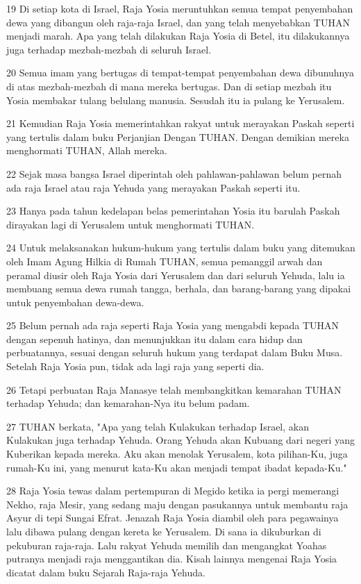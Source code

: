 \par 19 Di setiap kota di Israel, Raja Yosia meruntuhkan semua tempat penyembahan dewa yang dibangun oleh raja-raja Israel, dan yang telah menyebabkan TUHAN menjadi marah. Apa yang telah dilakukan Raja Yosia di Betel, itu dilakukannya juga terhadap mezbah-mezbah di seluruh Israel.
\par 20 Semua imam yang bertugas di tempat-tempat penyembahan dewa dibunuhnya di atas mezbah-mezbah di mana mereka bertugas. Dan di setiap mezbah itu Yosia membakar tulang belulang manusia. Sesudah itu ia pulang ke Yerusalem.
\par 21 Kemudian Raja Yosia memerintahkan rakyat untuk merayakan Paskah seperti yang tertulis dalam buku Perjanjian Dengan TUHAN. Dengan demikian mereka menghormati TUHAN, Allah mereka.
\par 22 Sejak masa bangsa Israel diperintah oleh pahlawan-pahlawan belum pernah ada raja Israel atau raja Yehuda yang merayakan Paskah seperti itu.
\par 23 Hanya pada tahun kedelapan belas pemerintahan Yosia itu barulah Paskah dirayakan lagi di Yerusalem untuk menghormati TUHAN.
\par 24 Untuk melaksanakan hukum-hukum yang tertulis dalam buku yang ditemukan oleh Imam Agung Hilkia di Rumah TUHAN, semua pemanggil arwah dan peramal diusir oleh Raja Yosia dari Yerusalem dan dari seluruh Yehuda, lalu ia membuang semua dewa rumah tangga, berhala, dan barang-barang yang dipakai untuk penyembahan dewa-dewa.
\par 25 Belum pernah ada raja seperti Raja Yosia yang mengabdi kepada TUHAN dengan sepenuh hatinya, dan menunjukkan itu dalam cara hidup dan perbuatannya, sesuai dengan seluruh hukum yang terdapat dalam Buku Musa. Setelah Raja Yosia pun, tidak ada lagi raja yang seperti dia.
\par 26 Tetapi perbuatan Raja Manasye telah membangkitkan kemarahan TUHAN terhadap Yehuda; dan kemarahan-Nya itu belum padam.
\par 27 TUHAN berkata, "Apa yang telah Kulakukan terhadap Israel, akan Kulakukan juga terhadap Yehuda. Orang Yehuda akan Kubuang dari negeri yang Kuberikan kepada mereka. Aku akan menolak Yerusalem, kota pilihan-Ku, juga rumah-Ku ini, yang menurut kata-Ku akan menjadi tempat ibadat kepada-Ku."
\par 28 Raja Yosia tewas dalam pertempuran di Megido ketika ia pergi memerangi Nekho, raja Mesir, yang sedang maju dengan pasukannya untuk membantu raja Asyur di tepi Sungai Efrat. Jenazah Raja Yosia diambil oleh para pegawainya lalu dibawa pulang dengan kereta ke Yerusalem. Di sana ia dikuburkan di pekuburan raja-raja. Lalu rakyat Yehuda memilih dan mengangkat Yoahas putranya menjadi raja menggantikan dia. Kisah lainnya mengenai Raja Yosia dicatat dalam buku Sejarah Raja-raja Yehuda.
